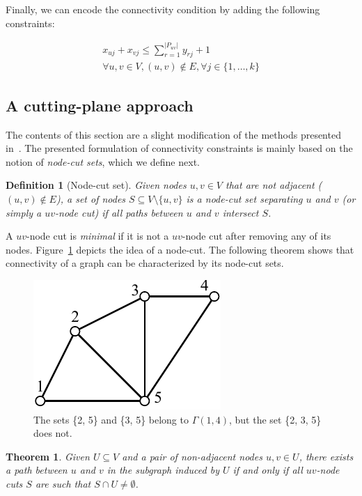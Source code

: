 \documentclass[conference,compsoc]{IEEEtran}
\newtheorem{theorem}{Theorem}
\newtheorem{definition}{Definition}
\begin{document}
Finally, we can encode the connectivity condition by adding the following constraints:

\begin{multline}
x_{uj} + x_{vj} \leq \sum_{r=1}^{|P_{uv}|} y_{rj} + 1 \\
\forall u, v \in V, (u, v) \notin E, \forall j \in \{1, \ldots, k\}
\end{multline}

\subsection{A cutting-plane approach}
 The contents of this
section are a slight modification of the methods presented in~\cite{CarvajalCGVW13}. The presented formulation of connectivity constraints is mainly based on the notion of \emph{node-cut sets}, which we define next. 

\begin{definition}[Node-cut set]
Given nodes $u, v \in V$ that are not adjacent ($(u, v) \notin E$), a set of nodes $S \subseteq V \setminus \{u, v\}$ is a \emph{node-cut set} separating $u$ and $v$ (or simply a \emph{$uv$-node cut}) if all paths between $u$ and $v$ intersect $S$.
\end{definition}

A $uv$-node cut is \emph{minimal} if it is not a $uv$-node cut after removing any of its nodes. Figure~\ref{fig:cutset} depicts the idea of a node-cut. The following theorem shows that connectivity of a graph can be characterized by its node-cut sets. 

\begin{figure}
\centering
\includegraphics[scale=0.7]{images/cutset}
\caption{The sets \{2, 5\} and \{3, 5\} belong to $\Gamma(1, 4)$, but the set \{2, 3, 5\} does not.}
\label{fig:cutset}
\end{figure}

\begin{theorem}
Given $U \subseteq V$ and a pair of non-adjacent nodes $u, v \in U$, there exists a path between $u$ and $v$ in the subgraph induced by $U$ if and only if all $uv$-node cuts $S$ are such that $S \cap U \neq \emptyset$.
\end{theorem}
\end{document}
